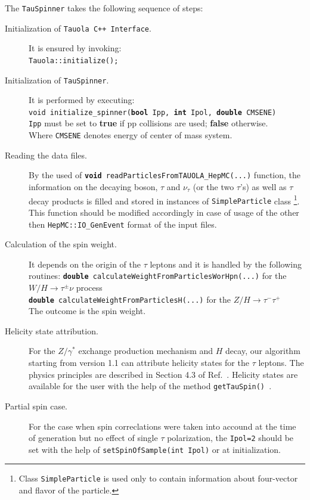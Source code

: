 \documentclass[12pt]{article}
\def\WHtaunu{\ensuremath{W/H\to\tau^{\pm}\nu}\xspace}
\def\ZHtautau{\ensuremath{Z/H\to\tau^{-}\tau^{+}}\xspace}
\def\Tau{\ensuremath{\tau}\xspace}
\begin{document}
The {\tt TauSpinner} takes the following sequence of steps:
\begin{description}
\item[ Initialization of {\tt Tauola C++ Interface}.] It is ensured by invoking:\\ 
   {\tt Tauola::initialize(); }
\item [Initialization of {\tt TauSpinner}.] It is performed by executing:\\
   {\tt void initialize\_spinner({\bf bool} Ipp, {\bf int} Ipol, {\bf double} CMSENE)} \\
   {\tt Ipp} must be set to {\bf true} if pp collisions are used; {\bf false} otherwise. \\
   Where {\tt CMSENE} denotes energy of center of mass system.
\item [Reading the data files.] By the used of {\tt {\bf void} readParticlesFromTAUOLA\_HepMC(...)} function, 
 the information on the decaying boson, \Tau and $\nu_{\tau}$ (or the two \Tau's)
 as well as \Tau decay products is filled and stored in instances of {\tt SimpleParticle} class%
 \footnote{Class {\tt SimpleParticle} is used only to contain information about
  four-vector and flavor of the particle.}.
 This function should be modified accordingly in case of usage of the other then 
 {\tt HepMC::IO\_GenEvent} format of the input files.
\item [Calculation of the spin weight.] It depends on the origin of the \Tau leptons
   and it is handled by the following routines:
   {\tt {\bf double} calculateWeightFromParticlesWorHpn(...)} for the \WHtaunu process\\
   {\tt {\bf double} calculateWeightFromParticlesH(...)} for the \ZHtautau \\
   The outcome is the spin weight.
\item [Helicity state attribution.] For the $Z/\gamma^*$ exchange production
mechanism and $H$ decay, our algorithm starting from version 1.1 can attribute 
helicity states for the $\tau$ leptons. The physics principles are described
in Section 4.3 of Ref.~\cite{Davidson:2010rw}.  Helicity states are available 
for the user with the help of the method {\tt getTauSpin() }.  
\item [ Partial spin case.]
For the case 
 when  spin correclations were taken into accound at the time of 
generation but no effect of single $\tau$ polarization, the
{\tt Ipol=2} should be set with the help of {\tt setSpinOfSample(int Ipol)}
or at initialization. 
\end{description}
\end{document}
